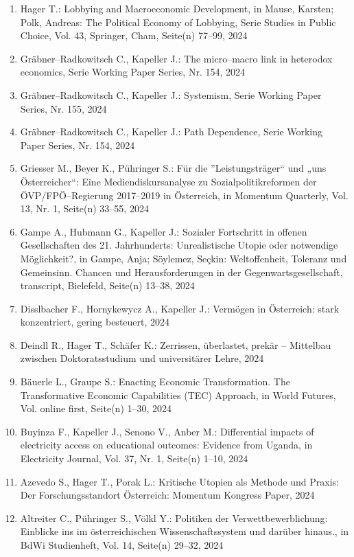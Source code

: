 \begin{enumerate}
	 \item Hager T.: Lobbying and Macroeconomic Development, in Mause, Karsten; Polk, Andreas: The Political Economy of Lobbying, Serie Studies in Public Choice, Vol. 43, Springer, Cham, Seite(n) 77--99, 2024
	 \item Gräbner--Radkowitsch C., Kapeller J.: The micro--macro link in heterodox economics, Serie Working Paper Series, Nr. 154, 2024
	 \item Gräbner--Radkowitsch C., Kapeller J.: Systemism, Serie Working Paper Series, Nr. 155, 2024
	 \item Gräbner--Radkowitsch C., Kapeller J.: Path Dependence, Serie Working Paper Series, Nr. 154, 2024
	 \item Griesser M., Beyer K., Pühringer S.: Für die ''Leistungsträger“ und „uns Österreicher“: Eine Mediendiskursanalyse zu Sozialpolitikreformen der ÖVP/FPÖ--Regierung 2017–2019 in Österreich, in Momentum Quarterly, Vol. 13, Nr. 1, Seite(n) 33--55, 2024
	 \item Gampe A., Hubmann G., Kapeller J.: Sozialer Fortschritt in offenen Gesellschaften des 21. Jahrhunderts: Unrealistische Utopie oder notwendige Möglichkeit?, in Gampe, Anja; Söylemez, Seçkin: Weltoffenheit, Toleranz und Gemeinsinn. Chancen und Herausforderungen in der Gegenwartsgesellschaft, transcript, Bielefeld, Seite(n) 13--38, 2024
	 \item Disslbacher F., Hornykewycz A., Kapeller J.: Vermögen in Österreich: stark konzen­triert, gering be­steuert, 2024
	 \item Deindl R., Hager T., Schäfer K.: Zerrissen, überlastet, prekär – Mittelbau zwischen Doktoratsstudium und universitärer Lehre, 2024
	 \item Bäuerle L., Graupe S.: Enacting Economic Transformation. The Transformative Economic Capabilities (TEC) Approach, in World Futures, Vol. online first, Seite(n) 1--30, 2024
	 \item Buyinza F., Kapeller J., Senono V., Anber M.: Differential impacts of electricity access on educational outcomes: Evidence from Uganda, in Electricity Journal, Vol. 37, Nr. 1, Seite(n) 1--10, 2024
	 \item Azevedo S., Hager T., Porak L.: Kritische Utopien als Methode und Praxis: Der Forschungsstandort Österreich: Momentum Kongress Paper, 2024
	 \item Altreiter C., Pühringer S., Völkl Y.: Politiken der Verwettbewerblichung: Einblicke ins im österreichischen Wissenschaftssystem und darüber hinaus., in BdWi Studienheft, Vol. 14, Seite(n) 29--32, 2024
\end{enumerate}
